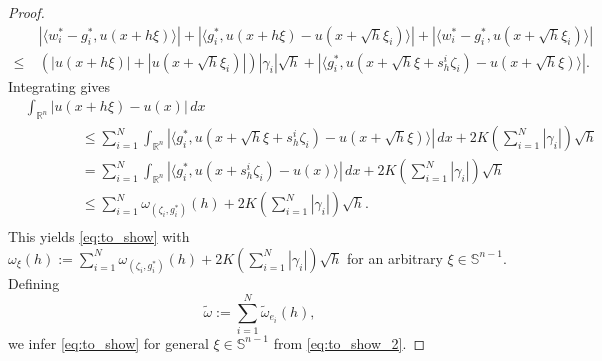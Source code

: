 \documentclass[10pt,a4paper]{amsart}
\newcommand{\R}{\mathbb{R}}
\newcommand{\s}{\mathbb{S}}
\begin{document}
\begin{proof}
    \begin{align*}
        &|\langle w_i^* - g_i^*, u(x + h\xi)\rangle| + |\langle g_i^*, u(x + h\xi) - u(x + \sqrt h \xi_{i})\rangle| + |\langle w_i^* - g_i^*, u(x + \sqrt h \xi_{i})\rangle| \\
        \leq \ & (|u(x + h\xi)| + |u(x + \sqrt h\xi_i)|)|\gamma_i| \sqrt h + |\langle g_i^*, u(x + \sqrt h \xi + s_h^i \zeta_i) - u(x + \sqrt h \xi) \rangle|.
    \end{align*}
    Integrating gives 
    \begin{align*}
        &\int_{\R^n} |u(x + h\xi) - u(x)| \, dx \\
        & \hspace{4em} \leq \sum_{i = 1}^N \int_{\R^n} |\langle g_i^*, u(x + \sqrt h \xi + s_h^i \zeta_i) - u(x + \sqrt h \xi) \rangle | \, dx + 2 K \left(\sum_{i = 1}^N|\gamma_i| \right)\sqrt h \\
        & \hspace{4em} = \sum_{i = 1}^N \int_{\R^n} |\langle g_i^*, u(x + s_h^i \zeta_i) - u(x) \rangle | \, dx + 2 K \left(\sum_{i = 1}^N|\gamma_i| \right)\sqrt h \\
        & \hspace{4em} \leq \sum_{i = 1}^N \omega_{(\zeta_i, g_i^*)}(h) + 2 K \left(\sum_{i = 1}^N|\gamma_i| \right)\sqrt h. \\
    \end{align*}
    This yields \eqref{eq:to_show} with $\omega_\xi(h) := \sum_{i = 1}^N \omega_{(\zeta_i, g_i^*)}(h) + 2 K \left(\sum_{i = 1}^N|\gamma_i| \right)\sqrt h$ for an arbitrary $\xi \in \s^{n-1}$. Defining 
    \[
        \tilde \omega := \sum_{i = 1}^N \tilde \omega_{e_i}(h),
    \]
    we infer \eqref{eq:to_show} for general $\xi \in \s^{n-1}$ from \eqref{eq:to_show_2}.
\end{proof}
\end{document}
